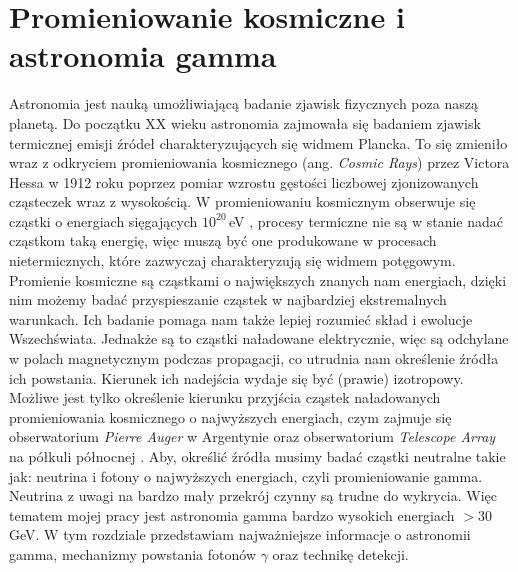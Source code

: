 \documentclass[a4paper,11pt,twoside]{article}
\begin{document}
\section{Promieniowanie kosmiczne i astronomia gamma}
Astronomia jest nauką umożliwiającą badanie zjawisk fizycznych poza naszą planetą. Do początku XX wieku astronomia zajmowała się badaniem zjawisk termicznej emisji źródeł charakteryzujących się widmem Plancka. To się zmieniło wraz z odkryciem promieniowania kosmicznego (ang. \textsl{Cosmic Rays}) przez Victora Hessa w 1912 roku poprzez pomiar wzrostu gęstości liczbowej zjonizowanych cząsteczek wraz z wysokością\cite{particle_de_angelis}. W promieniowaniu kosmicznym obserwuje się cząstki o energiach sięgających $10^{20}$\,eV \cite{particle_de_angelis}, procesy termiczne nie są w stanie nadać cząstkom taką energię, więc muszą być one produkowane w procesach nietermicznych, które zazwyczaj charakteryzują się widmem potęgowym. \\
Promienie kosmiczne są cząstkami o największych znanych nam energiach, 
dzięki nim możemy badać przyspieszanie cząstek w najbardziej ekstremalnych warunkach. Ich badanie pomaga nam także lepiej rozumieć skład i ewolucje Wszechświata. Jednakże są to cząstki naładowane elektrycznie, więc są odchylane w polach magnetycznym podczas propagacji, co utrudnia nam określenie źródła ich powstania. Kierunek ich nadejścia wydaje się być (prawie) izotropowy. Możliwe jest tylko określenie kierunku przyjścia cząstek naładowanych promieniowania kosmicznego o najwyższych energiach, czym zajmuje się obserwatorium \textsl{Pierre Auger} w Argentynie \cite{auger_web} \cite{auger_result} oraz obserwatorium \textsl{Telescope Array} na półkuli północnej \cite{telescope_array_web}. Aby, określić źródła musimy badać cząstki neutralne takie jak: neutrina i fotony o najwyższych energiach, czyli promieniowanie gamma. Neutrina z uwagi na bardzo mały przekrój czynny są trudne do wykrycia. Więc tematem mojej pracy jest astronomia gamma bardzo wysokich energiach $>30$\,GeV. W tym rozdziale przedstawiam najważniejsze informacje o astronomii gamma, mechanizmy powstania fotonów $\gamma$ oraz technikę detekcji.
\end{document}
